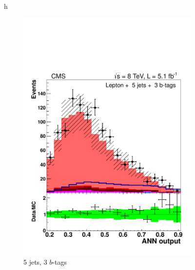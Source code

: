 \begin{figure}{h}
\begin{subfigure}[h]{0.31\textwidth}
        \includegraphics[width=\textwidth]{Figures/Analysis_1_Diagrams/d2MCPlots_CFMlpANN_cut5_j5_t3_Combined_HtWgt.pdf}
        \caption{5 jets, 3 $b$-tags}\label{lj_ANNoutput_8TeV_3}
      \end{subfigure}
      ~ %
      \begin{subfigure}[h]{0.31\textwidth}

\end{subfigure}
\end{figure}
